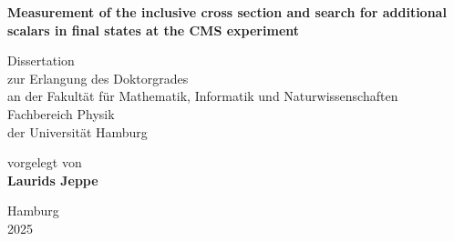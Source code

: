 
\thispagestyle{empty}
\onehalfspacing

\begin{titlepage}
\begin{center}
  \vspace*{0cm}

  \LARGE %
  \bfseries 
    Measurement of the inclusive \ttbar cross section and search for additional scalars in \ttbar final states at the CMS experiment

  \vspace{4cm}

  \normalfont
  \LARGE
    Dissertation\\

  \vspace{1cm}
  \normalfont
  \normalsize
    zur Erlangung des Doktorgrades \\
    an der Fakult{\"a}t f{\"u}r Mathematik, Informatik und Naturwissenschaften\\
    Fachbereich Physik\\
    der Universität Hamburg

 
  \vspace{1cm}
    vorgelegt von\\
  \bfseries 
  \large
   Laurids Jeppe

  \normalfont
  \large
  \vspace{3cm}
  Hamburg\\
  2025
\end{center}
\end{titlepage}



